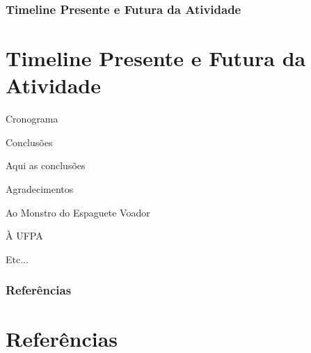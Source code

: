 \documentclass[11pt]{beamer}
\begin{document}
\begin{frame}
\frametitle{Timeline Presente e Futura da Atividade}
\section{Timeline Presente e Futura da Atividade}

Cronograma

\end{frame}



\begin{frame}{Conclusões}

Aqui as conclusões

\end{frame}


\begin{frame}{Agradecimentos}

Ao Monstro do Espaguete Voador

À UFPA

Etc...

\end{frame}

\begin{frame}[allowframebreaks]
\frametitle{Referências}
       \section{Referências}



\end{frame}
\end{document}
